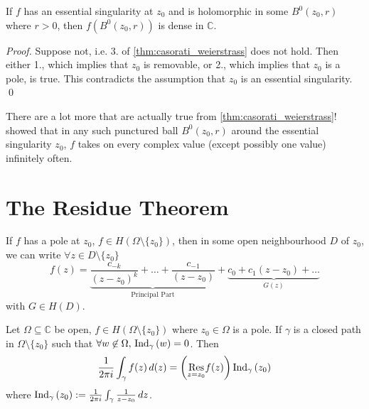 \documentclass[notoc,notitlepage]{tufte-book}
\begin{document}
\begin{crly}\label{crly:casorati_weierstrass_crly}
If $f$ has an essential singularity at $z_0$ and is holomorphic in some $B^0(z_0, r)$ where $r > 0$, then $f(B^0(z_0, r))$ is dense in $\mathbb{C}$.
\end{crly}

\begin{proof}
  Suppose not, i.e. 3. of \cref{thm:casorati_weierstrass} does not hold. Then either 1., which implies that $z_0$ is removable, or 2., which implies that $z_0$ is a pole, is true. This contradicts the assumption that $z_0$ is an essential singularity. \qed
\end{proof}

\begin{remark}
  There are a lot more that are actually true from \cref{thm:casorati_weierstrass}!  showed that in any such punctured ball $B^0(z_0, r)$ around the essential singularity $z_0$, $f$ takes on every complex value (except possibly one value) infinitely often.
\end{remark}


\section{The Residue Theorem} %

\begin{note}[Recall]
  If $f$ has a pole at $z_0$, $f \in H(\Omega \setminus \{z_0\})$, then in some open neighbourhood $D$ of $z_0$, we can write $\forall z \in D \setminus \{z_0\}$
  \begin{equation}\label{eq:function_at_a_pole}
    f(z) = \underbrace{ \frac{c_{-k}}{(z - z_0)^k} + \hdots + \frac{c_{-1}}{(z - z_0)} }_{\text{Principal Part}} + \underbrace{ c_0 + c_1 (z - z_0) + \hdots }_{G(z)}
  \end{equation}
  with $G \in H(D)$.
\end{note}

\begin{thm}\label{thm:cauchy_s_residue_theorem}
  Let $\Omega \subseteq \mathbb{C}$ be open, $f \in H(\Omega \setminus \{z_0\})$ where $z_0 \in \Omega$ is a pole. If $\gamma$ is a closed path in $\Omega \setminus \{z_0\}$ such that $\forall w \not\in \Omega, \, \ind{w}{\gamma} = 0$. Then
  \begin{equation*}
    \frac{1}{2 \pi i} \int_{\gamma} f(z) \dif(z) = \left( \res{f(z)}{z = z_0} \right) \ind{z_0}{\gamma}
  \end{equation*}
  where $\ind{z_0}{\gamma} := \frac{1}{2 \pi i} \int_{\gamma} \frac{1}{z - z_0} \dif{z}$.
\end{thm}
\end{document}
